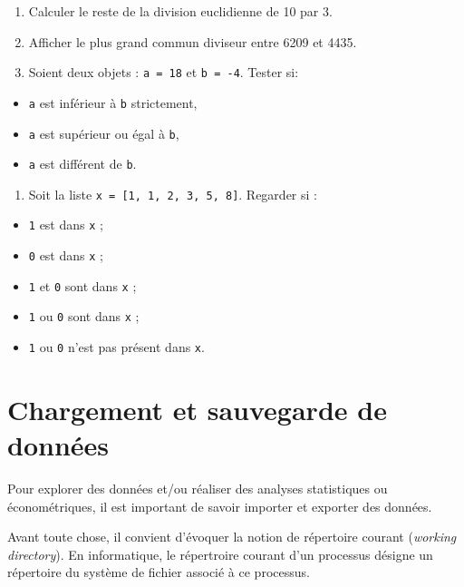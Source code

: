 \documentclass[
  12pt,
]{book}
\makeatletter
\providecommand{\tightlist}{%
  \setlength{\itemsep}{0pt}\setlength{\parskip}{0pt}}
\numberwithin{equation}{section}
\numberwithin{countremarque}{section}
\newenvironment{exframe}{%
 \def\at@end@of@exframe{}%
 \ifinner\ifhmode%
  \def\at@end@of@exframe{\end{minipage}}%
  \begin{minipage}{\columnwidth}%
 \fi\fi%
 \def\FrameCommand##1{\hskip\@totalleftmargin \hskip-\fboxsep
 \colorbox{shadecolorex}{##1}\hskip-\fboxsep
     \hskip-\linewidth \hskip-\@totalleftmargin \hskip\columnwidth}%
 \MakeFramed {\advance\hsize-\width
   \@totalleftmargin\z@ \linewidth\hsize
   \@setminipage}}%
 {\par\unskip\endMakeFramed%
 \at@end@of@exframe}
\makeatother
\begin{document}
\begin{exframe}
\begin{enumerate}
\def\labelenumi{\arabic{enumi}.}
\tightlist
\item
  Calculer le reste de la division euclidienne de 10 par 3.
\item
  Afficher le plus grand commun diviseur entre 6209 et 4435.
\item
  Soient deux objets : \texttt{a\ =\ 18} et \texttt{b\ =\ -4}. Tester si:
\end{enumerate}

\begin{itemize}
\tightlist
\item
  \texttt{a} est inférieur à \texttt{b} strictement,
\item
  \texttt{a} est supérieur ou égal à \texttt{b},
\item
  \texttt{a} est différent de \texttt{b}.
\end{itemize}

\begin{enumerate}
\def\labelenumi{\arabic{enumi}.}
\setcounter{enumi}{3}
\tightlist
\item
  Soit la liste \texttt{x\ =\ {[}1,\ 1,\ 2,\ 3,\ 5,\ 8{]}}. Regarder si :
\end{enumerate}

\begin{itemize}
\tightlist
\item
  \texttt{1} est dans \texttt{x} ;
\item
  \texttt{0} est dans \texttt{x} ;
\item
  \texttt{1} et \texttt{0} sont dans \texttt{x} ;
\item
  \texttt{1} ou \texttt{0} sont dans \texttt{x} ;
\item
  \texttt{1} ou \texttt{0} n'est pas présent dans \texttt{x}.
\end{itemize}
\end{exframe}

\chapter{Chargement et sauvegarde de données}\label{chargement-et-sauvegarde-de-donnuxe9es}

Pour explorer des données et/ou réaliser des analyses statistiques ou économétriques, il est important de savoir importer et exporter des données.

Avant toute chose, il convient d'évoquer la notion de répertoire courant (\emph{working directory}). En informatique, le répertroire courant d'un processus désigne un répertoire du système de fichier associé à ce processus.
\end{document}
